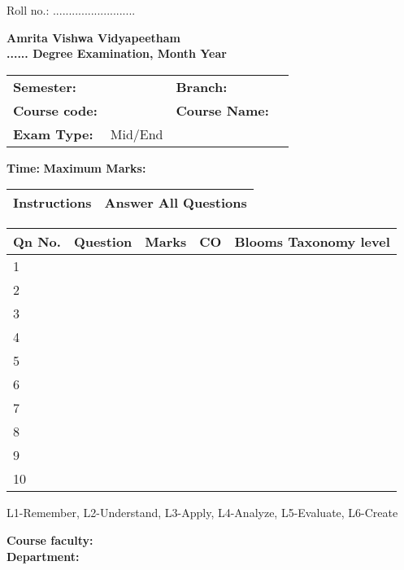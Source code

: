 \documentclass[12pt,a4paper]{article}
\author{Jinesh M.K}
\begin{document}
\begin{flushright}
Roll no.: ..........................
\end{flushright}
\begin{center}
{\bf Amrita Vishwa Vidyapeetham}\\

{\bf ...... Degree Examination, Month Year}\\



\end{center}


\begin{table}[h!]
\begin{tabular}{p{}p{}p{}p{}}

\textbf{Semester:}    &                  & \textbf{Branch:}         &  \\ 
\textbf{Course code:} &         & \textbf{Course Name:}    &  \\ 
\textbf{Exam Type:}    & Mid/End & \textbf{}               &  \\ 

\end{tabular}
\end{table}
\textbf{Time:} \hfill \textbf{Maximum Marks:}

\begin{table}[h!]
\begin{tabular}{|p{}|p{}|}
\hline
\textbf{Instructions} &  Answer All Questions \\
\hline
\end{tabular}
\end{table}

\begin{table}[h!]
\begin{tabular}
{|p{}|p{}|p{}|p{}|p{}|}
\hline
\textbf{Qn No.}&\textbf{Question} &	\textbf{Marks}&\textbf{CO} &	\textbf{Blooms Taxonomy level} \\ \hline

1&&&&\\ \hline
2&&&&\\ \hline
3&&&&\\ \hline
4&&&&\\ \hline
5&&&&\\ \hline
6&&&&\\ \hline
7&&&&\\ \hline
8&&&&\\ \hline
9&&&&\\ \hline
10&&&&\\ \hline
\end{tabular}
L1-Remember, L2-Understand, L3-Apply, L4-Analyze, L5-Evaluate, L6-Create
\vspace{1em}


\textbf{Course faculty:} \\
\textbf{Department:}

\end{table}
\end{document}
